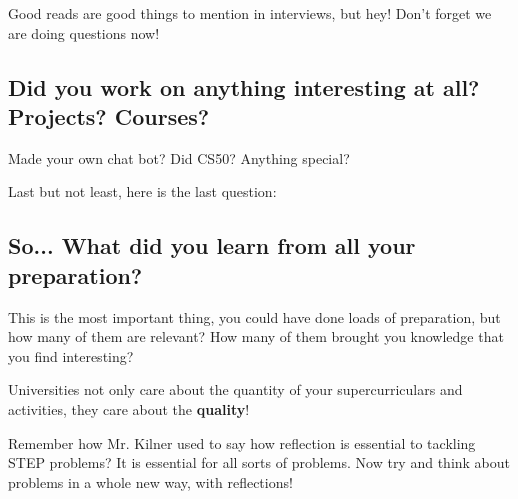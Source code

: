 \documentclass[12pt]{article}
\begin{document}
Good reads are good things to mention in interviews, but hey! Don't forget we are doing questions now!

\subsection{Did you work on anything interesting at all? Projects? Courses?}
Made your own chat bot? Did CS50? Anything special?

Last but not least, here is the last question:

\subsection{So... What did you learn from all your preparation?}
This is the most important thing, you could have done loads of preparation, but how many of them are relevant? How many of them brought you knowledge that you find interesting? 

Universities not only care about the quantity of your supercurriculars and activities, they care about the \textbf{quality}!

Remember how Mr. Kilner used to say how reflection is essential to tackling STEP problems? It is essential for all sorts of problems. Now try and think about problems in a whole new way, with reflections!
\end{document}
